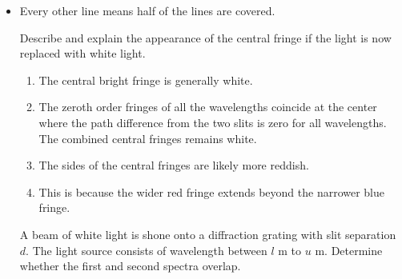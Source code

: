 \documentclass[oneside]{book}
\begin{document}
\begin{itemize}
    \item Every other line means half of the lines are covered.
    \begin{example}{}{}
        Describe and explain the appearance of the central fringe if the light is now replaced with white light.
    \begin{enumerate}
        \item The central bright fringe is generally white.
        \item The zeroth order fringes of all the wavelengths coincide at the center where the path difference from the two slits is zero for all wavelengths. The combined central fringes remains white.
        \item The sides of the central fringes are likely more reddish.
        \item  This is because the wider red fringe extends beyond the narrower blue fringe.
    \end{enumerate}
    \end{example}
    \begin{example}{}{}
        A beam of white light is shone onto a diffraction grating with slit separation \(d\). The light source consists of wavelength between \(l\) m to \(u\) m. Determine whether the first and second spectra overlap.


\end{example}
\end{itemize}
\end{document}
